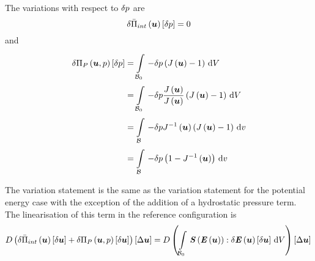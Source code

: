 The variations with respect to $  \delta  p $ are
\begin{equation}
     \delta   \bar{\Pi}_{int}\left(  \boldsymbol{u}  \right) \left[   \delta  p  \right]  =0
\end{equation}
and
\begin{equation}
  \begin{split}
    \variation{\fnof{\Pi_{P}}{\vectr{u},p}}{p}&=\gint{\embedmanifold{B}_{0}}{}{-\variationdir{p}\pbrac{\fnof{J}{\vectr{u}}-1}}{V}\\
    &=\gint{\embedmanifold{B}_{0}}{}{-\variationdir{p}\dfrac{\fnof{J}{\vectr{u}}}{\fnof{J}{\vectr{u}}}\pbrac{\fnof{J}{\vectr{u}}-1}}{V}\\
    &=\gint{\embedmanifold{B}}{}{-\variationdir{p}\fnof{\inverse{J}}{\vectr{u}}\pbrac{\fnof{J}{\vectr{u}}-1}}{v}\\
    &=\gint{\embedmanifold{B}}{}{-\variationdir{p}\pbrac{1-\fnof{\inverse{J}}{\vectr{u}}}}{v}
  \end{split}
\end{equation}

The variation statement is the same as the variation statement for the
potential energy case with the exception of the addition of a hydrostatic
pressure term. The linearisation of this term in the reference configuration is
\begin{equation}
  \directionalderiv{}{\variation{\fnof{\bar{\Pi}_{int}}{\vectr{u}}}{\vectr{u}}+\variation{\fnof{\Pi_{P}}{\vectr{u},p}}{\vectr{u}}}{\linearisationdir{\vectr{u}}}=\directionalderiv{}{\gint{\embedmanifold{B}_{0}}{}{\doubledotprod{\fnof{\tensor{S}}{
            \fnof{\tensor{E}}{\vectr{u}}}}{\variation{\fnof{\tensor{E}}{\vectr{u}}}{\vectr{u}}}}{V}}{\linearisationdir{\vectr{u}}}\\
\end{equation}

